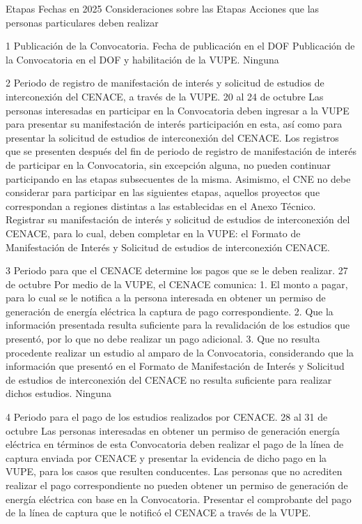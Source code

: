  Etapas
 Fechas en 2025
 Consideraciones sobre las Etapas
 Acciones que las personas particulares deben realizar
 
 1
 Publicación de la Convocatoria.
 Fecha de publicación en el DOF
 Publicación de la Convocatoria en el DOF y habilitación de la VUPE.
 Ninguna
 
 2
 Periodo de registro de manifestación de interés y solicitud de estudios de interconexión del CENACE, a través de la VUPE.
 20 al 24 de octubre
 Las personas interesadas en participar en la Convocatoria deben ingresar a la VUPE para presentar su manifestación de interés participación en esta, así como para presentar la solicitud de estudios de interconexión del CENACE.
Los registros que se presenten después del fin de periodo de registro de manifestación de interés de participar en la Convocatoria, sin excepción alguna, no pueden continuar participando en las etapas subsecuentes de la misma.
Asimismo, el CNE no debe considerar para participar en las siguientes etapas, aquellos proyectos que correspondan a regiones distintas a las establecidas en el Anexo Técnico.
 Registrar su manifestación de interés y solicitud de estudios de interconexión del CENACE, para lo cual, deben completar en la VUPE: el Formato de Manifestación de Interés y Solicitud de estudios de interconexión CENACE.
 
 3
 Periodo para que el CENACE determine los pagos que se le deben realizar.
 27 de octubre
 Por medio de la VUPE, el CENACE comunica:
1. El monto a pagar, para lo cual se le notifica a la persona interesada en obtener un permiso de generación de energía eléctrica la captura de pago correspondiente.
2. Que la información presentada resulta suficiente para la revalidación de los estudios que presentó, por lo que no debe realizar un pago adicional.
3. Que no resulta procedente realizar un estudio al amparo de la Convocatoria, considerando que la información que presentó en el Formato de Manifestación de Interés y Solicitud de estudios de interconexión del CENACE no resulta suficiente para realizar dichos estudios.
 Ninguna
 
 4
 Periodo para el pago de los estudios realizados por CENACE.
 28 al 31 de octubre
 Las personas interesadas en obtener un permiso de generación energía eléctrica en términos de esta Convocatoria deben realizar el pago de la línea de captura enviada por CENACE y presentar la evidencia de dicho pago en la VUPE, para los casos que resulten conducentes.
Las personas que no acrediten realizar el pago correspondiente no pueden obtener un permiso de generación de energía eléctrica con base en la Convocatoria.
 Presentar el comprobante del pago de la línea de captura que le notificó el CENACE a través de la VUPE.
 

